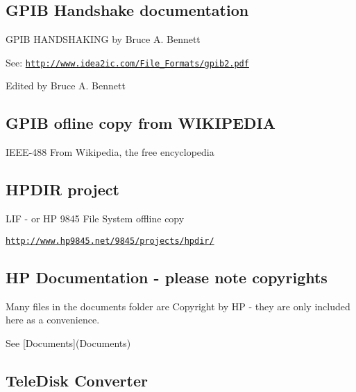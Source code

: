 \subsection*{G\+P\+IB Handshake documentation}


\begin{DoxyItemize}
\item G\+P\+IB H\+A\+N\+D\+S\+H\+A\+K\+I\+NG by Bruce A. Bennett
\begin{DoxyItemize}
\item See\+: \href{http://www.idea2ic.com/File_Formats/gpib2.pdf}{\tt http\+://www.\+idea2ic.\+com/\+File\+\_\+\+Formats/gpib2.\+pdf}
\begin{DoxyItemize}
\item Edited by Bruce A. Bennett 


\end{DoxyItemize}
\end{DoxyItemize}
\end{DoxyItemize}

\subsection*{G\+P\+IB ofline copy from W\+I\+K\+I\+P\+E\+D\+IA}


\begin{DoxyItemize}
\item I\+E\+E\+E-\/488 From Wikipedia, the free encyclopedia 

 \subsection*{H\+P\+D\+IR project}
\end{DoxyItemize}


\begin{DoxyItemize}
\item L\+IF -\/ or HP 9845 File System offline copy
\begin{DoxyItemize}
\item \href{http://www.hp9845.net/9845/projects/hpdir/}{\tt http\+://www.\+hp9845.\+net/9845/projects/hpdir/} 

 \subsection*{HP Documentation -\/ please note copyrights}
\end{DoxyItemize}

Many files in the documents folder are Copyright by HP -\/ they are only included here as a convenience.
\item See \mbox{[}Documents\mbox{]}(Documents) 

 \subsection*{Tele\+Disk Converter}
\end{DoxyItemize}


